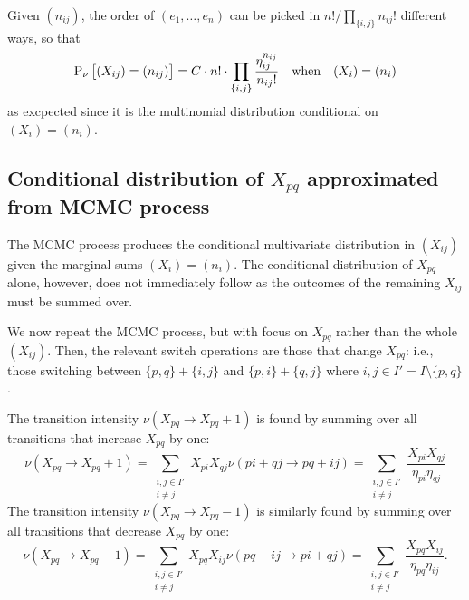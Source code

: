 \documentclass{myaptpub}%
\newcommand\Prob{\sP}
\newcommand\Prt[1]{\Prob_\nu\left[#1\right]}%
\newcommand\Transition[2]{\nu(#1\rightarrow#2)}
\newcommand\transition[2]{\Transition{\transPair#1:}{\transPair#2:}}
\def\transPair#1#2+#3#4:{#1#2+#3#4}
\begin{document}
Given $(n_{ij})$, the order of $(e_1,\ldots,e_n)$ can be picked in $n!/\prod_{\{i,j\}} n_{ij}!$ different ways,
so that
\begin{equation}\nonumber
\Prt{\strut(X_{ij})=(n_{ij})}=C\cdot n!\cdot\prod_{\{i,j\}}\frac{\eta_{ij}^{n_{ij}}}{n_{ij}!}
\quad\text{when}\quad(X_i)=(n_i)
\end{equation}
as excpected since it is the multinomial distribution conditional on $(X_i)=(n_i)$.


\subsection{Conditional distribution of $X_{pq}$ approximated from MCMC process}

The MCMC process produces the conditional multivariate distribution in $(X_{ij})$ given the marginal sums $(X_i)=(n_i)$. The conditional distribution of $X_{pq}$ alone, however, does not immediately follow as the outcomes of the remaining $X_{ij}$ must be summed over.

We now repeat the MCMC process, but with focus on $X_{pq}$ rather than the whole $(X_{ij})$. Then, the relevant switch operations are those that change $X_{pq}$: i.e., those switching between $\{p,q\}+\{i,j\}$ and $\{p,i\}+\{q,j\}$ where $i,j\in I'=I\setminus\{p,q\}$.

The transition intensity $\Transition{X_{pq}}{X_{pq}+1}$ is found by summing over all transitions that increase $X_{pq}$ by one:
\begin{equation}\nonumber
\Transition{X_{pq}}{X_{pq}+1}
=\sum_{\substack{i,j\in I'\\ i\not=j}} X_{pi}X_{qj}\transition{pi+qj}{pq+ij}%
=\sum_{\substack{i,j\in I'\\ i\not=j}}\frac{X_{pi}X_{qj}}{\eta_{pi}\eta_{qj}}
\end{equation}
The transition intensity $\Transition{X_{pq}}{X_{pq}-1}$ is similarly found by summing over all transitions that decrease $X_{pq}$ by one:
\begin{equation}\nonumber
\Transition{X_{pq}}{X_{pq}-1}
=\sum_{\substack{i,j\in I'\\ i\not=j}} X_{pq}X_{ij}\transition{pq+ij}{pi+qj}%
=\sum_{\substack{i,j\in I'\\ i\not=j}} \frac{X_{pq}X_{ij}}{\eta_{pq}\eta_{ij}}.
\end{equation}
\end{document}
